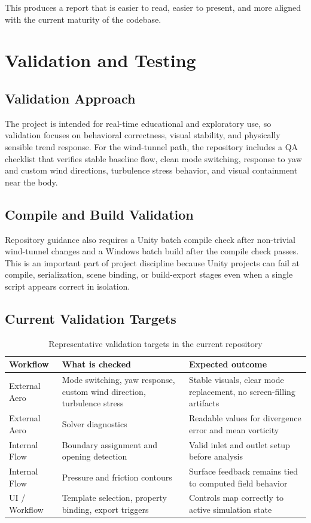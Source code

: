 \documentclass[12pt,a4paper,titlepage]{report}
\begin{document}
This produces a report that is easier to read, easier to present, and more aligned with the current maturity of the codebase.

\chapter{Validation and Testing}
\section{Validation Approach}
The project is intended for real-time educational and exploratory use, so validation focuses on behavioral correctness, visual stability, and physically sensible trend response. For the wind-tunnel path, the repository includes a QA checklist that verifies stable baseline flow, clean mode switching, response to yaw and custom wind directions, turbulence stress behavior, and visual containment near the body.

\section{Compile and Build Validation}
Repository guidance also requires a Unity batch compile check after non-trivial wind-tunnel changes and a Windows batch build after the compile check passes. This is an important part of project discipline because Unity projects can fail at compile, serialization, scene binding, or build-export stages even when a single script appears correct in isolation.

\section{Current Validation Targets}
\begin{table}[H]
\centering
\caption{Representative validation targets in the current repository}
\label{tab:validation}
\begin{tabular}{p{3.2cm}p{4.9cm}p{4.8cm}}
\toprule
\textbf{Workflow} & \textbf{What is checked} & \textbf{Expected outcome} \\
\midrule
External Aero & Mode switching, yaw response, custom wind direction, turbulence stress & Stable visuals, clear mode replacement, no screen-filling artifacts \\
External Aero & Solver diagnostics & Readable values for divergence error and mean vorticity \\
Internal Flow & Boundary assignment and opening detection & Valid inlet and outlet setup before analysis \\
Internal Flow & Pressure and friction contours & Surface feedback remains tied to computed field behavior \\
UI / Workflow & Template selection, property binding, export triggers & Controls map correctly to active simulation state \\
\bottomrule
\end{tabular}
\end{table}
\end{document}
